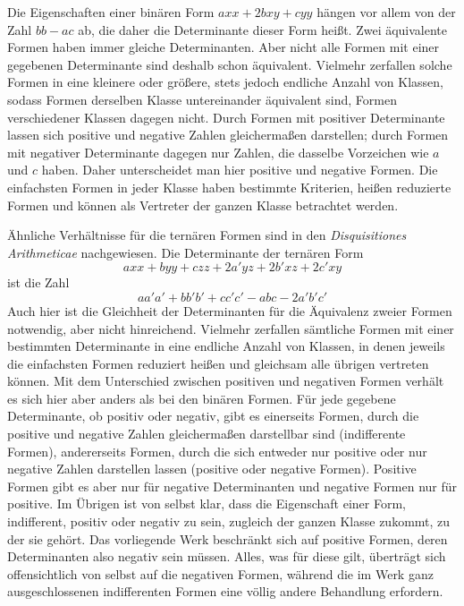 Die Eigenschaften einer binären Form $axx+2bxy+cyy$ hängen vor allem von der Zahl $bb-ac$ ab, die daher die Determinante dieser Form heißt. Zwei äquivalente Formen haben immer gleiche Determinanten. Aber nicht alle Formen mit einer gegebenen Determinante sind deshalb schon äquivalent. Vielmehr zerfallen solche Formen in eine kleinere oder größere, stets jedoch endliche Anzahl von Klassen, sodass Formen derselben Klasse untereinander äquivalent sind, Formen verschiedener Klassen dagegen nicht. Durch Formen mit positiver Determinante lassen sich positive und negative Zahlen gleichermaßen darstellen; durch Formen mit negativer Determinante dagegen nur Zahlen, die dasselbe Vorzeichen wie $a$ und $c$ haben. Daher unterscheidet man hier positive und negative Formen. Die einfachsten Formen in jeder Klasse haben bestimmte Kriterien, heißen reduzierte Formen und können als Vertreter der ganzen Klasse betrachtet werden.

Ähnliche Verhältnisse für die ternären Formen sind in den \emph{Disquisitiones Arithmeticae} nachgewiesen. Die Determinante der ternären Form
\[
axx+byy+czz+2a'yz+2b'xz+2c'xy
\]
ist die Zahl
\[
aa'a'+bb'b'+cc'c'-abc-2a'b'c'
\]
Auch hier ist die Gleichheit der Determinanten für die Äquivalenz zweier Formen notwendig, aber nicht hinreichend. Vielmehr zerfallen sämtliche Formen mit einer bestimmten Determinante in eine endliche Anzahl von Klassen, in denen jeweils die einfachsten Formen reduziert heißen und gleichsam alle übrigen vertreten können. Mit dem Unterschied zwischen positiven und negativen Formen verhält es sich hier aber anders als bei den binären Formen. Für jede gegebene Determinante, ob positiv oder negativ, gibt es einerseits Formen, durch die
positive und negative Zahlen gleichermaßen darstellbar sind (indifferente Formen), andererseits Formen, durch die sich entweder nur positive oder nur negative Zahlen darstellen lassen (positive oder negative Formen). Positive Formen gibt es aber nur für negative Determinanten und negative Formen nur für positive. Im Übrigen ist von selbst klar, dass die Eigenschaft einer Form, indifferent, positiv oder negativ zu sein, zugleich der ganzen Klasse zukommt, zu der sie gehört. Das vorliegende Werk beschränkt sich auf positive Formen, deren Determinanten also negativ sein müssen. Alles, was für diese gilt, überträgt sich offensichtlich von selbst auf die negativen Formen, während die im Werk ganz ausgeschlossenen indifferenten Formen eine völlig andere Behandlung erfordern.

